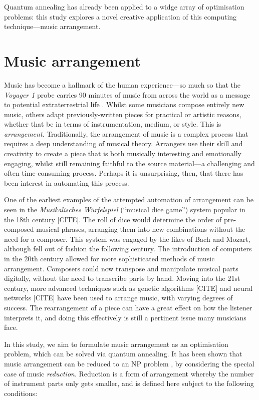 \documentclass[12pt]{article}
\theoremstyle{definition}
\begin{document}
Quantum annealing has already been applied to a widge array of optimisation problems: this study explores a novel creative application of this computing technique---music arrangement.


\section{Music arrangement}
\label{sec:arrangement}

Music has become a hallmark of the human experience---so much so that the \textit{Voyager 1} probe carries 90 minutes of music from across the world as a message to potential extraterrestrial life \cite{nasa_golden_2024}. Whilst some musicians compose entirely new music, others adapt previously-written pieces for practical or artistic reasons, whether that be in terms of instrumentation, medium, or style. This is \emph{arrangement}.
Traditionally, the arrangement of music is a complex process that requires a deep understanding of musical theory. Arrangers use their skill and creativity to create a piece that is both musically interesting and emotionally engaging, whilst still remaining faithful to the source material---a challenging and often time-consuming process. Perhaps it is unsurprising, then, that there has been interest in automating this process.

One of the earliest examples of the attempted automation of arrangement can be seen in the \textit{Musikalisches Würfelspiel} (``musical dice game'') system popular in the 18th century [CITE]. The roll of dice would determine the order of pre-composed musical phrases, arranging them into new combinations without the need for a composer. This system was engaged by the likes of Bach and Mozart, although fell out of fashion the following century.
The introduction of computers in the 20th century allowed for more sophisticated methods of music arrangement. Composers could now transpose and manipulate musical parts digitally, without the need to transcribe parts by hand. Moving into the 21st century, more advanced techniques such as genetic algorithms [CITE] and neural networks [CITE] have been used to arrange music, with varying degrees of success. The rearrangement of a piece can have a great effect on how the listener interprets it, and doing this effectively is still a pertinent issue many musicians face. 

In this study, we aim to formulate music arrangement as an optimisation problem, which can be solved via quantum annealing. It has been shown that music arrangement can be reduced to an NP problem \cite{moses_computational_2016}, by considering the special case of music \emph{reduction}. Reduction is a form of arrangement whereby the number of instrument parts only gets smaller, and is defined here subject to the following conditions:
\end{document}
